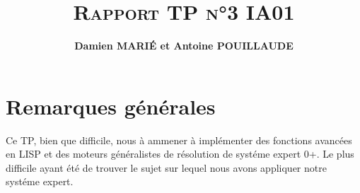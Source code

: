 \documentclass[a4paper, 12pt, leqno]{report}
\title{\textsc{\textbf{Rapport TP n°3 IA01}}}
\author{\textbf{Damien MARI\'E et Antoine POUILLAUDE}}
\theoremstyle{plain}
\begin{document}
    \maketitle
    \tableofcontents
\newpage
\section*{Remarques générales}
		Ce TP, bien que difficile, nous à ammener à implémenter des fonctions avancées en LISP et des moteurs généralistes de résolution de systéme expert 0+. Le plus difficile ayant été de trouver le sujet sur lequel nous avons appliquer notre systéme expert.




                
\end{document}
